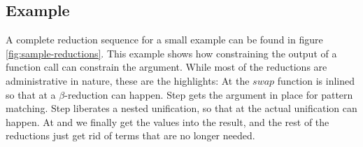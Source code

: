 \documentclass[acmsmall,review,dvipsnames]{acmart}
\newcommand{\Varid}[1]{\mathit{#1}}
\begin{document}
\subsection{Example}
A complete reduction sequence for a small example can be found in figure \ref{fig:sample-reductions}.
This example shows how constraining the output of a function call can constrain the argument.
While most of the reductions are administrative in nature, these are the highlights:
At  the \ensuremath{\Varid{swap}} function is inlined so that at  a $\beta$-reduction can happen.
Step  gets the argument in place for pattern matching.  Step  liberates a nested unification,
so that at  the actual unification can happen.
At  and  we finally get the values into the result,
and the rest of the reductions just get rid of terms that are no longer needed.
\end{document}
